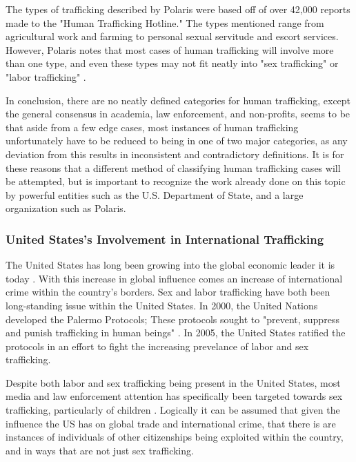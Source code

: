 \documentclass{article} %
\begin{document}
The types of trafficking described by Polaris were based off of over 42,000 reports made to the "Human Trafficking Hotline." The types mentioned range from agricultural work and farming to personal sexual servitude and escort services. However, Polaris notes that most cases of human trafficking will involve more than one type, and even these types may not fit neatly into "sex trafficking" or "labor trafficking" \parencite{polarisTypology}.

In conclusion, there are no neatly defined categories for human trafficking, except the general consensus in academia, law enforcement, and non-profits, seems to be that aside from a few edge cases, most instances of human trafficking unfortunately have to be reduced to being in one of two major categories, as any deviation from this results in inconsistent and contradictory definitions. It is for these reasons that a different method of classifying human trafficking cases will be attempted, but is important to recognize the work already done on this topic by powerful entities such as the U.S. Department of State, and a large organization such as Polaris.

\subsubsection*{United States's Involvement in International Trafficking}

The United States has long been growing into the global economic leader it is today \parencite{USEconPower}. With this increase in global influence comes an increase of international crime within the country's borders. Sex and labor trafficking have both been long-standing issue within the United States. In 2000, the United Nations developed the Palermo Protocols; These protocols sought to "prevent, suppress and punish trafficking in human beings" \parencite{Polermo}. In 2005, the United States ratified the protocols in an effort to fight the increasing prevelance of labor and sex trafficking. 

Despite both labor and sex trafficking being present in the United States, most media and law enforcement attention has specifically been targeted towards sex trafficking, particularly of children \parencite{MediaRep}. Logically it can be assumed that given the influence the US has on global trade and international crime, that there is are instances of individuals of other citizenships being exploited within the country, and in ways that are not just sex trafficking.
\end{document}
